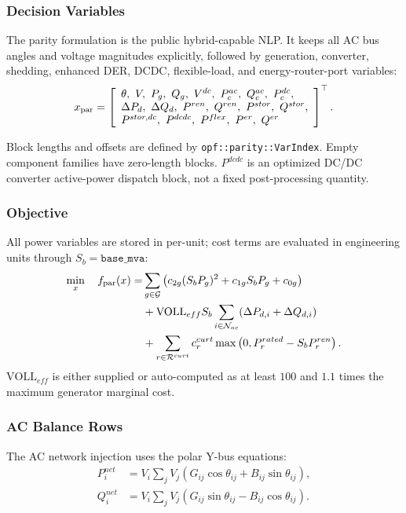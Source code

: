 \subsubsection{Decision Variables}

The parity formulation is the public hybrid-capable NLP.  It keeps all AC bus
angles and voltage magnitudes explicitly, followed by generation, converter,
shedding, enhanced DER, DCDC, flexible-load, and energy-router-port variables:
\begin{align}
x_{\mathrm{par}}=
\left[
\begin{array}{l}
\theta,\ V,\ P_g,\ Q_g,\ V^{dc},\ P_c^{ac},\ Q_c^{ac},\ P_c^{dc},\\
\Delta P_d,\ \Delta Q_d,\ P^{ren},\ Q^{ren},\ P^{stor},\ Q^{stor},\\
P^{stor,dc},\ P^{dcdc},\ P^{flex},\ P^{er},\ Q^{er}
\end{array}
\right]^{\top}.
\end{align}

Block lengths and offsets are defined by
\texttt{opf::parity::VarIndex}.  Empty component families have zero-length
blocks.  \(P^{dcdc}\) is an optimized DC/DC converter active-power dispatch
block, not a fixed post-processing quantity.

\subsubsection{Objective}

All power variables are stored in per-unit; cost terms are evaluated in
engineering units through \(S_b=\texttt{base\_mva}\):
\begin{align}
\min_x\quad
f_{\mathrm{par}}(x)=&
\sum_{g\in\mathcal{G}}
\left(c_{2g}(S_bP_g)^2+c_{1g}S_bP_g+c_{0g}\right) \nonumber\\
&+\mathrm{VOLL}_{eff}S_b
\sum_{i\in\mathcal{N}_{ac}}(\Delta P_{d,i}+\Delta Q_{d,i}) \nonumber\\
&+
\sum_{r\in\mathcal{R}^{curt}}
c_r^{curt}\max\left(0,P_r^{rated}-S_bP_r^{ren}\right).
\end{align}
\(\mathrm{VOLL}_{eff}\) is either supplied or auto-computed as at least
\(100\) and \(1.1\) times the maximum generator marginal cost.

\subsubsection{AC Balance Rows}

The AC network injection uses the polar Y-bus equations:
\begin{align}
P_i^{net}&=
V_i\sum_j V_j
\left(G_{ij}\cos\theta_{ij}+B_{ij}\sin\theta_{ij}\right),\\
Q_i^{net}&=
V_i\sum_j V_j
\left(G_{ij}\sin\theta_{ij}-B_{ij}\cos\theta_{ij}\right).
\end{align}

